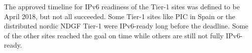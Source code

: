 
 
The approved timeline for IPv6 readiness of the Tier-1 sites was defined to be April 2018, but not all succeeded.
Some Tier-1 sites like PIC in Spain or the distributed nordic NDGF Tier-1 were IPv6-ready long before the deadline. Some of the other sites reached the goal on time while others are still not fully IPv6-ready. 


 

